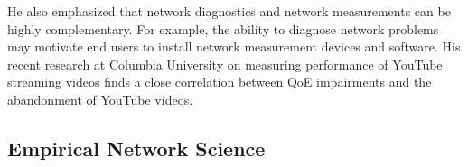 He also emphasized that network diagnostics and network measurements can be
highly complementary. For example, the ability to diagnose network problems
may motivate end users to install network measurement devices and software.
His recent research at Columbia University on measuring performance of YouTube
streaming videos \cite{hnam:infocom:2016} finds a close correlation between
\ac{QoE} impairments and the abandonment of YouTube videos.



\subsection{Empirical Network Science}

